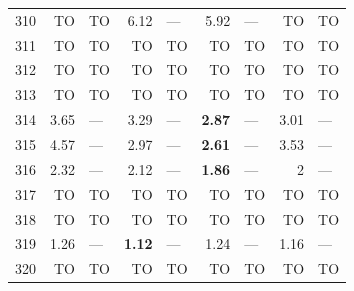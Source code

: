 \begin{longtable}{lr@{\hskip 4pt}l@{\hskip 12pt}r@{\hskip 4pt}l@{\hskip 12pt}r@{\hskip 4pt}l@{\hskip 12pt}r@{\hskip 4pt}l@{\hskip 12pt}}
310 & TO & TO & 6.12 & --- & 5.92 & --- & TO & TO \\
311 & TO & TO & TO & TO & TO & TO & TO & TO \\
312 & TO & TO & TO & TO & TO & TO & TO & TO \\
313 & TO & TO & TO & TO & TO & TO & TO & TO \\
314 & 3.65 & --- & 3.29 & --- & \textbf{2.87} & --- & 3.01 & --- \\
315 & 4.57 & --- & 2.97 & --- & \textbf{2.61} & --- & 3.53 & --- \\
316 & 2.32 & --- & 2.12 & --- & \textbf{1.86} & --- & 2 & --- \\
317 & TO & TO & TO & TO & TO & TO & TO & TO \\
318 & TO & TO & TO & TO & TO & TO & TO & TO \\
319 & 1.26 & --- & \textbf{1.12} & --- & 1.24 & --- & 1.16 & --- \\
320 & TO & TO & TO & TO & TO & TO & TO & TO \\
\bottomrule
\end{longtable}